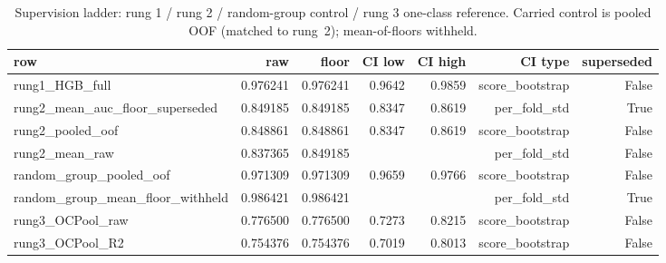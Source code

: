 \begin{table}[ht]
\centering
\caption{Supervision ladder: rung 1 / rung 2 / random-group control / rung 3 one-class reference.
Carried control is pooled OOF (matched to rung~2); mean-of-floors withheld.}
\label{tab:t4-ladder}
\begin{tabular}{lrrrrrr}
\toprule
row & raw & floor & CI low & CI high & CI type & superseded \\
\midrule
rung1\_HGB\_full & 0.976241 & 0.976241 & 0.9642 & 0.9859 & score\_bootstrap & False \\
rung2\_mean\_auc\_floor\_superseded & 0.849185 & 0.849185 & 0.8347 & 0.8619 & per\_fold\_std & True \\
rung2\_pooled\_oof & 0.848861 & 0.848861 & 0.8347 & 0.8619 & score\_bootstrap & False \\
rung2\_mean\_raw & 0.837365 & 0.849185 &  &  & per\_fold\_std & False \\
random\_group\_pooled\_oof & 0.971309 & 0.971309 & 0.9659 & 0.9766 & score\_bootstrap & False \\
random\_group\_mean\_floor\_withheld & 0.986421 & 0.986421 &  &  & per\_fold\_std & True \\
rung3\_OCPool\_raw & 0.776500 & 0.776500 & 0.7273 & 0.8215 & score\_bootstrap & False \\
rung3\_OCPool\_R2 & 0.754376 & 0.754376 & 0.7019 & 0.8013 & score\_bootstrap & False \\
\bottomrule
\end{tabular}
\end{table}
